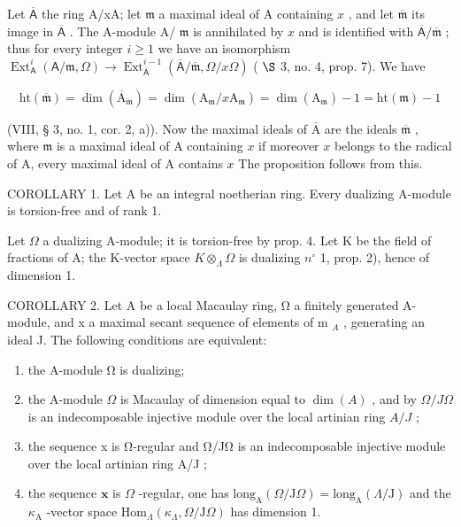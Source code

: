 Let \(\overline{\mathsf{A}}\) the ring A/xA; let \(\mathfrak{m}\) a maximal ideal of A containing \(x\) , and let \(\overline{\mathfrak{m}}\) its image in \(\overline{\mathsf{A}}\) . The A-module A/ \(\mathfrak{m}\) is annihilated by \(x\) and is identified with \(\overline{\mathsf{A}}/\overline{\mathfrak{m}}\) ; thus for every integer \(i \geqslant 1\) we have an isomorphism \(\operatorname{Ext}_{\mathsf{A}}^{i}(\mathsf{A}/\mathfrak{m}, \Omega) \longrightarrow \operatorname{Ext}_{\overline{\mathsf{A}}}^{i-1}(\overline{\mathsf{A}}/\overline{\mathfrak{m}}, \Omega/x\Omega)\) ( \(\S\) 3, no. 4, prop. 7). We have

\[
\mathrm{ht} (\overline {{\mathfrak {m}}}) = \dim (\overline {{\mathrm{A}}} _ {\overline {{\mathfrak {m}}}}) = \dim (\mathrm{A} _ {\mathfrak {m}} / x \mathrm{A} _ {\mathfrak {m}}) = \dim (\mathrm{A} _ {\mathfrak {m}}) - 1 = \mathrm{ht} (\mathfrak {m}) - 1
\]

(VIII, § 3, no. 1, cor. 2, a)). Now the maximal ideals of \(\overline{\mathrm{A}}\) are the ideals \(\overline{\mathfrak{m}}\) , where \(\mathfrak{m}\) is a maximal ideal of A containing \(x\) if moreover \(x\) belongs to the radical of A, every maximal ideal of A contains \(x\) The proposition follows from this.

COROLLARY 1. Let A be an integral noetherian ring. Every dualizing A-module is torsion-free and of rank 1.

Let \(\Omega\) a dualizing A-module; it is torsion-free by prop. 4. Let K be the field of fractions of A; the K-vector space \(K \otimes_{\Lambda} \Omega\) is dualizing \(n^{\circ}\) 1, prop. 2), hence of dimension 1.

COROLLARY 2. Let A be a local Macaulay ring, Ω a finitely generated A-module, and x a maximal secant sequence of elements of m \(_{A}\) , generating an ideal J. The following conditions are equivalent:

\begin{enumerate}
\def\labelenumi{(\roman{enumi})}
\item
  the A-module Ω is dualizing;
\item
  the A-module \(\Omega\) is Macaulay of dimension equal to \(\dim(A)\) , and by \(\Omega/J\Omega\) is an indecomposable injective module over the local artinian ring \(A/J\) ;
\item
  the sequence x is Ω-regular and Ω/JΩ is an indecomposable injective module over the local artinian ring A/J ;
\item
  the sequence \(\mathbf{x}\) is \(\Omega\) -regular, one has \(\mathrm{long}_{\mathrm{A}}(\Omega/\mathrm{J}\Omega) = \mathrm{long}_{\mathrm{A}}(\Lambda/\mathrm{J})\) and the \(\kappa_{\mathrm{A}}\) -vector space \(\mathrm{Hom}_{\Lambda}(\kappa_{\Lambda}, \Omega/\mathrm{J}\Omega)\) has dimension 1.
\end{enumerate}

